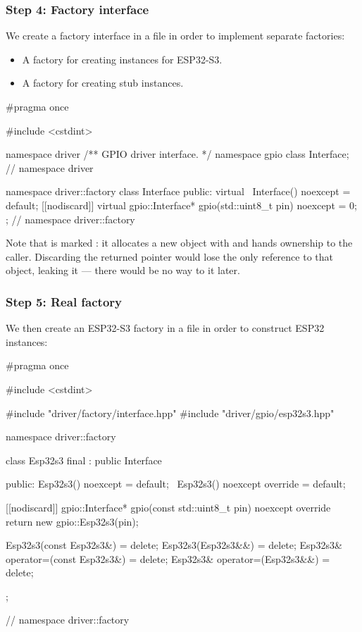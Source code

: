 \subsubsection{Step 4: Factory interface}
We create a factory interface in a file  in order to implement
separate factories:
\begin{itemize}
  \item A factory for creating instances for ESP32-S3.
  \item A factory for creating stub instances.
\end{itemize}

\begin{cppcode}
#pragma once

#include <cstdint>

namespace driver
{
/** GPIO driver interface. */
namespace gpio { class Interface; }
} // namespace driver

namespace driver::factory
{
class Interface
{
public:
    virtual ~Interface() noexcept = default;
    [[nodiscard]] virtual gpio::Interface* gpio(std::uint8_t pin) noexcept = 0;
};
} // namespace driver::factory
\end{cppcode}

\noindent Note that  is marked \code{[[nodiscard]]}: it allocates a new object with
 and hands ownership to the caller. Discarding the returned pointer would lose the only
reference to that object, leaking it --- there would be no way to  it later.

\subsubsection{Step 5: Real factory}
We then create an ESP32-S3 factory in a file  in order to
construct ESP32 instances:

\begin{cppcode}
#pragma once

#include <cstdint>

#include "driver/factory/interface.hpp"
#include "driver/gpio/esp32s3.hpp"

namespace driver::factory
{
class Esp32s3 final : public Interface
{
public:
    Esp32s3() noexcept = default;
    ~Esp32s3() noexcept override = default;

    [[nodiscard]] gpio::Interface* gpio(const std::uint8_t pin) noexcept override
    {
        return new gpio::Esp32s3(pin);
    }

    Esp32s3(const Esp32s3&)            = delete;
    Esp32s3(Esp32s3&&)                 = delete;
    Esp32s3& operator=(const Esp32s3&) = delete;
    Esp32s3& operator=(Esp32s3&&)      = delete;
};
} // namespace driver::factory
\end{cppcode}

